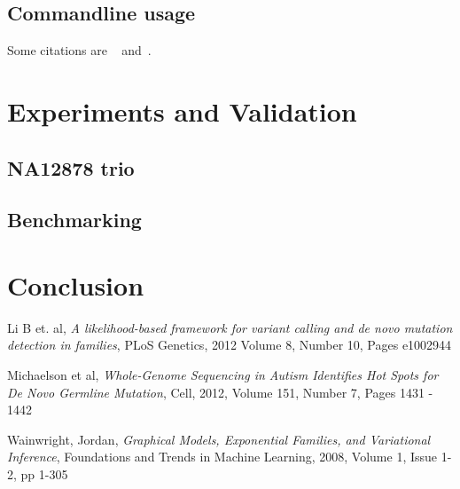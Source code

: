\documentclass{article}
\begin{document}
\subsection{Commandline usage}


Some citations are ~\cite{Li2012} and~\cite{Michaelson2012}.

\section{Experiments and Validation}

\subsection{NA12878 trio}

\subsection{Benchmarking}

\section{Conclusion}

\begin{thebibliography}{10}

   Li B et. al,
   \emph{A likelihood-based framework for variant calling and de novo mutation detection in families},
   PLoS Genetics, 2012
   Volume 8, Number 10, Pages e1002944

   Michaelson et al,
   \emph{Whole-Genome Sequencing in Autism Identifies Hot Spots for De Novo Germline Mutation},  
   Cell, 2012, 
   Volume 151, Number 7, Pages 1431 - 1442

	Wainwright, Jordan,
	\emph{Graphical Models, Exponential Families, and Variational Inference},
	Foundations and Trends in Machine Learning, 2008,
	Volume 1, Issue 1-2, pp 1-305	
	
\end{thebibliography}
\end{document}
